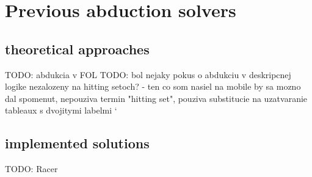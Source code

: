 \chapter{Previous abduction solvers}\label{chap:previous_solutions}
		\section{theoretical approaches}
		TODO: abdukcia v FOL
TODO: bol nejaky pokus o abdukciu v deskripcnej logike nezalozeny na hitting setoch? - ten co som nasiel na mobile by sa mozno dal spomenut, nepouziva termin "hitting set", pouziva substitucie na uzatvaranie tableaux s dvojitymi labelmi
	`	\section{implemented solutions}
		TODO: Racer